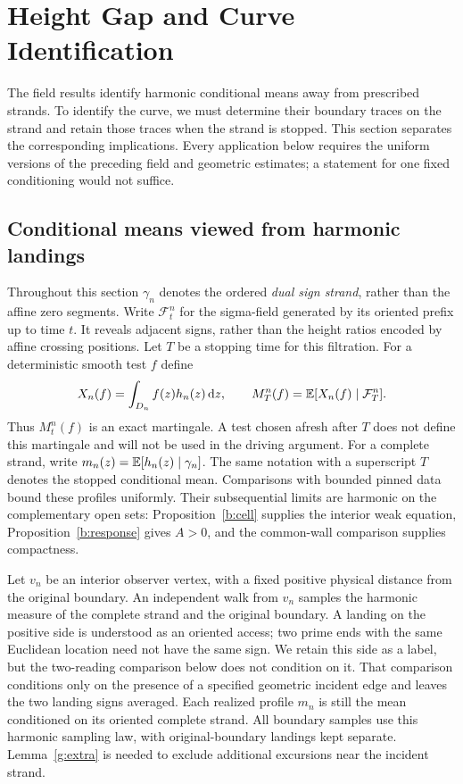 \section{Height Gap and Curve Identification}\label{sec:interface}

The field results identify harmonic conditional means away from prescribed
strands. To identify the curve, we must determine their boundary traces on
the strand and retain those traces when the strand is stopped. This section
separates the corresponding implications. Every application below requires
the uniform versions of the preceding field and geometric estimates; a
statement for one fixed conditioning would not suffice.

\subsection{Conditional means viewed from harmonic landings}

Throughout this section $\gamma_n$ denotes the ordered \emph{dual sign
strand}, rather than the affine zero segments. Write $\mathcal F^n_t$
for the sigma-field generated by its oriented prefix up to time $t$.
It reveals adjacent signs, rather than the height ratios encoded by
affine crossing positions. Let $T$ be a stopping time for this filtration.
For a deterministic smooth test $f$ define
\[
 X_n(f)=\int_{D_n}f(z)h_n(z)\,\mathrm d z,\qquad
 M^n_T(f)=\mathbb E[X_n(f)\mid\mathcal F^n_T].
\]
Thus $M^n_t(f)$ is an exact martingale. A test chosen afresh after $T$ does
not define this martingale and will not be used in the driving argument.
For a complete strand, write
$m_n(z)=\mathbb E[h_n(z)\mid\gamma_n]$.
The same notation with a superscript $T$ denotes the stopped conditional
mean. Comparisons with bounded pinned data bound these profiles uniformly.
Their subsequential limits are harmonic on the complementary open sets:
Proposition~\ref{b:cell} supplies the interior weak equation,
Proposition~\ref{b:response} gives $A>0$, and the common-wall comparison
supplies compactness.

Let $v_n$ be an interior observer vertex, with a fixed positive physical
distance from the original boundary. An independent walk from $v_n$
samples the harmonic measure
of the complete strand and the original boundary. A landing on the
positive side is understood as an oriented access; two prime ends with the
same Euclidean location need not have the same sign. We retain this side
as a label, but the two-reading comparison below does not condition on
it. That comparison conditions only on the presence of a specified
geometric incident edge and leaves the two landing signs averaged.
Each realized profile $m_n$ is still the mean conditioned on its
oriented complete strand. All boundary samples use this harmonic
sampling law, with original-boundary landings kept separate.
Lemma~\ref{g:extra} is needed to exclude additional excursions near
the incident strand.

